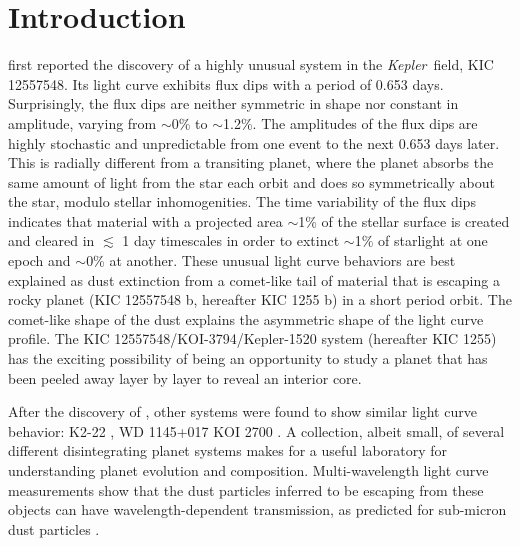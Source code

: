 \documentclass[preprint,trackchanges]{aastex61}
\newcommand{\sha}{KIC 1255 b}
\newcommand{\shStar}{KIC 1255}
\newcommand{\kepler}{{\it Kepler}}
\begin{document}
\section{Introduction}\label{sec:intro}
\citet{rappaport} first reported the discovery of a highly unusual system in the \kepler\ field, KIC 12557548.
Its light curve exhibits flux dips with a period of 0.653 days.
Surprisingly, the flux dips are neither symmetric in shape nor constant in amplitude, varying from $\sim$0\% to $\sim$1.2\%.
The amplitudes of the flux dips are highly stochastic and unpredictable from one event to the next 0.653 days later.
This is radially different from a transiting planet, where the planet absorbs the same amount of light from the star each orbit and does so symmetrically about the star, modulo stellar inhomogenities.
The time variability of the flux dips indicates that material with a projected area $\sim$1\% of the stellar surface is created and cleared in $\lesssim$ 1 day timescales in order to extinct $\sim$1\% of starlight at one epoch and $\sim$0\% at another.
These unusual light curve behaviors are best explained as dust extinction from a comet-like tail of material that is escaping a rocky planet (KIC 12557548 b, hereafter \sha) in a short period orbit.
The comet-like shape of the dust explains the asymmetric shape of the light curve profile.
The KIC 12557548/KOI-3794/Kepler-1520 system (hereafter \shStar) has the exciting possibility of being an opportunity to study a planet that has been peeled away layer by layer to reveal an interior core.

After the discovery of \replaced{K1255}{\shStar}, other systems were found to show similar light curve behavior: K2-22 \citep{sanchis-ojedak2-22}, WD 1145+017 \citep{vanderburg2015wdDisintegrating}  KOI 2700 \citep{rappaport2014KOI2700} .
A collection, albeit small, of several different disintegrating planet systems makes for a useful laboratory for understanding planet evolution and composition.
Multi-wavelength light curve measurements show that the dust particles inferred to be escaping from these objects can have wavelength-dependent transmission, as predicted for sub-micron dust particles \citep{bochinski2015evolving,sanchis-ojedak2-22}.
\end{document}
